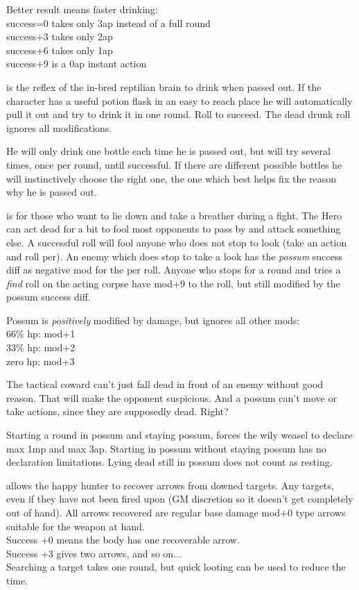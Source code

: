 Better result means faster drinking:\\
success=0 takes only 3ap instead of a full round\\
success+3 takes only 2ap\\
success+6 takes only 1ap\\
success+9 is a 0ap instant action


 is the reflex of the in-bred reptilian brain to drink when passed out. If the character has a useful potion flask in an easy to reach place he will automatically pull it out and try to drink it in one round. Roll to succeed. The dead drunk roll ignores all modifications.

He will only drink one bottle each time he is passed out, but will try several times, once per round, until successful. If there are different possible bottles he will instinctively choose the right one, the one which best helps fix the reason why he is passed out.


 is for those who want to lie down and take a breather during a fight. The Hero can act dead for a bit to fool most opponents to pass by and attack something else. A successful roll will fool anyone who does not stop to look (take an action and roll per). An enemy which does stop to take a look has the \emph{possum} success diff as negative mod for the per roll. Anyone who stops for a round and tries a \emph{find} roll on the acting corpse have mod+9 to the roll, but still modified by the possum success diff.

Possum is \emph{positively} modified by damage, but ignores all other mods:\\
66\% hp: mod+1\\
33\% hp: mod+2\\
zero hp: mod+3

The tactical coward can't just fall dead in front of an enemy without good reason. That will make the opponent suspicious. And a possum can't move or take actions, since they are supposedly dead. Right?

Starting a round in possum and staying possum, forces the wily weasel to declare max 1mp and max 3ap. Starting in possum without staying possum has no declaration limitations. Lying dead still in possum does not count as resting.


 allows the happy hunter to recover arrows from downed targets. Any targets, even if they have not been fired upon (GM discretion so it doesn't get completely out of hand). All arrows recovered are regular base damage mod+0 type arrows suitable for the weapon at hand.\\
Success +0 means the body has one recoverable arrow. \\
Success +3 gives two arrows, and so on...\\
Searching a target takes one round, but quick looting can be used to reduce the time.

